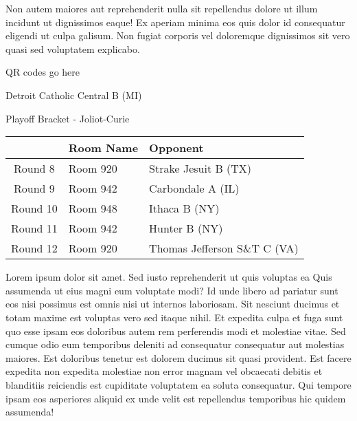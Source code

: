 \documentclass{article}%
\begin{document}
\newline%
Non autem maiores aut reprehenderit nulla sit repellendus dolore ut illum incidunt ut dignissimos eaque! Ex aperiam minima eos quis dolor id consequatur eligendi ut culpa galisum. Non fugiat corporis vel doloremque dignissimos sit vero quasi sed voluptatem explicabo.\newline%
\newline%
%
\vspace*{30pt}%
\begin{center}%
\begin{Huge}%
QR codes go here%
\end{Huge}%
\end{center}%
\newpage%
\begin{center}%
\begin{Huge}%
Detroit Catholic Central B (MI)%
\end{Huge}%
\vspace*{8pt}%
\linebreak%
\begin{Large}%
Playoff Bracket {-} Joliot{-}Curie%
\end{Large}%
\end{center}%
\begin{tabularx}{\textwidth}{|c|Y|Y|}%
\hline%
&Room Name&Opponent\\%
\hline%
Round 8&Room 920&Strake Jesuit B (TX)\\%
Round 9&Room 942&Carbondale A (IL)\\%
Round 10&Room 948&Ithaca B (NY)\\%
Round 11&Room 942&Hunter B (NY)\\%
Round 12&Room 920&Thomas Jefferson S\&T C (VA)\\%
\hline%
\end{tabularx}%
\vspace*{8pt}%
\linebreak%
\newline%
\newline%
Lorem ipsum dolor sit amet. Sed iusto reprehenderit ut quis voluptas ea Quis assumenda ut eius magni eum voluptate modi? Id unde libero ad pariatur sunt eos nisi possimus est omnis nisi ut internos laboriosam. Sit nesciunt ducimus et totam maxime est voluptas vero sed itaque nihil. Et expedita culpa et fuga sunt quo esse ipsam eos doloribus autem rem perferendis modi et molestiae vitae.\newline%
\newline%
Sed cumque odio eum temporibus deleniti ad consequatur consequatur aut molestias maiores. Est doloribus tenetur est dolorem ducimus sit quasi provident. Est facere expedita non expedita molestiae non error magnam vel obcaecati debitis et blanditiis reiciendis est cupiditate voluptatem ea soluta consequatur. Qui tempore ipsam eos asperiores aliquid ex unde velit est repellendus temporibus hic quidem assumenda!\newline%
\end{document}
